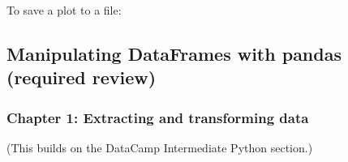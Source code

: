 \documentclass[letterpaper,10pt,english]{jupyterBook}
\begin{document}
\begin{sphinxVerbatim}[commandchars=\\\{\}]
    
\end{sphinxVerbatim}

\sphinxAtStartPar
To save a plot to a file:

\begin{sphinxVerbatim}[commandchars=\\\{\}]
    
\end{sphinxVerbatim}


\subsection{Manipulating DataFrames with pandas (required review)}
\label{\detokenize{big-cheat-sheet:manipulating-dataframes-with-pandas-required-review}}

\subsubsection{Chapter 1: Extracting and transforming data}
\label{\detokenize{big-cheat-sheet:chapter-1-extracting-and-transforming-data}}
\sphinxAtStartPar
(This builds on the DataCamp Intermediate Python section.)
\end{document}
